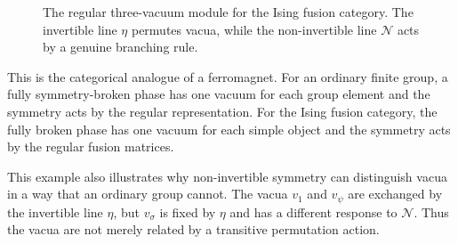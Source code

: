 \documentclass[11pt]{article}
\newcommand{\cN}{\mathcal{N}}
\begin{document}
\begin{figure}[htbp]
\centering
{}
\caption{The regular three-vacuum module for the Ising fusion category.  The invertible line $\eta$ permutes vacua, while the non-invertible line $\cN$ acts by a genuine branching rule.}
\label{fig:IsingThreeVacua}
\end{figure}

This is the categorical analogue of a ferromagnet.  For an ordinary finite group, a fully symmetry-broken phase has one vacuum for each group element and the symmetry acts by the regular representation.  For the Ising fusion category, the fully broken phase has one vacuum for each simple object and the symmetry acts by the regular fusion matrices.

This example also illustrates why non-invertible symmetry can distinguish vacua in a way that an ordinary group cannot.  The vacua $v_1$ and $v_\psi$ are exchanged by the invertible line $\eta$, but $v_\sigma$ is fixed by $\eta$ and has a different response to $\cN$.  Thus the vacua are not merely related by a transitive permutation action.
\end{document}
